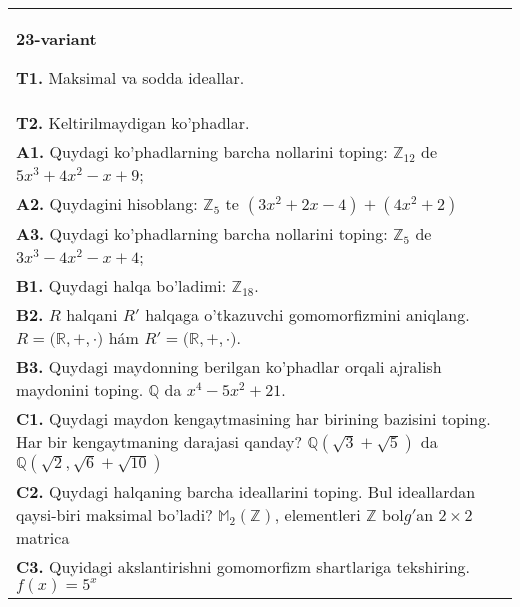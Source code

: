 \documentclass{article}
\begin{document}
\begin{tabular}{m{17cm}}
\textbf{23-variant}
\newline

\textbf{T1.} Maksimal va sodda ideallar. \\
\textbf{T2.} Keltirilmaydigan ko'phadlar. \\
\textbf{A1.} Quydagi ko'phadlarning barcha nollarini toping:
\(\mathbb{Z}_{12}\) de \(5x^{3} + 4x^{2} - x + 9\); \\
\textbf{A2.} Quydagini hisoblang:
\(\mathbb{Z}_{5}\) te \(\left( 3x^{2} + 2x - 4 \right) + \left( 4x^{2} + 2 \right)\) \\
\textbf{A3.} Quydagi ko'phadlarning barcha nollarini toping:
\(\mathbb{Z}_{5}\) de \(3x^{3} - 4x^{2} - x + 4\); \\
\textbf{B1.} Quydagi halqa bo'ladimi:
\(\mathbb{Z}_{18}\). \\
\textbf{B2.} \(R\) halqani \(R'\) halqaga o'tkazuvchi gomomorfizmini aniqlang.
\(R\mathbb{= (R,} + , \cdot )\) hám \(R'\mathbb{= (R,} + , \cdot )\). \\
\textbf{B3.} Quydagi maydonning berilgan ko'phadlar orqali ajralish maydonini toping.
\(\mathbb{Q}\) da \(x^{4} - 5x^{2} + 21\). \\
\textbf{C1.} Quydagi maydon kengaytmasining har birining bazisini toping. Har bir kengaytmaning darajasi qanday?
\(\mathbb{Q}\left( \sqrt{3} + \sqrt{5} \right)\) da \(\mathbb{Q}\left( \sqrt{2},\sqrt{6} + \sqrt{10} \right)\) \\
\textbf{C2.} Quydagi halqaning barcha ideallarini toping. Bul ideallardan qaysi-biri maksimal bo'ladi?
\(\mathbb{M}_{2}\left( \mathbb{Z} \right)\), elementleri \(\mathbb{Z}\) bol\(g'\)an \(2 \times 2\) matrica \\
\textbf{C3.} Quyidagi akslantirishni gomomorfizm shartlariga tekshiring. \(f(x) = 5^{x}\) \\

\end{tabular}
\vspace{1cm}
\end{document}
